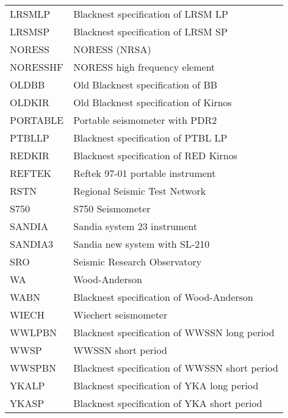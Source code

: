\begin{table}[tp]
\begin{tabular}{ll}
LRSMLP   &  Blacknest specification of LRSM LP  \\
LRSMSP   &  Blacknest specification of LRSM SP  \\
NORESS   &  NORESS (NRSA)   \\
NORESSHF &  NORESS high frequency element   \\
OLDBB    &  Old Blacknest specification of BB   \\
OLDKIR   &  Old Blacknest specification of Kirnos   \\
PORTABLE &  Portable seismometer with PDR2  \\
PTBLLP   &  Blacknest specification of PTBL LP  \\
REDKIR   &  Blacknest specification of RED Kirnos   \\
REFTEK   &  Reftek 97-01 portable instrument    \\
RSTN     &  Regional Seismic Test Network   \\
S750     &  S750 Seismometer    \\
SANDIA   &  Sandia system 23 instrument \\
SANDIA3  &  Sandia new system with SL-210   \\
SRO      &  Seismic Research Observatory    \\
WA       &  Wood-Anderson   \\
WABN     &  Blacknest specification of Wood-Anderson    \\
WIECH    &  Wiechert seismometer    \\
WWLPBN   &  Blacknest specification of WWSSN long period    \\
WWSP     &  WWSSN short period  \\
WWSPBN   &  Blacknest specification of WWSSN short period   \\
YKALP    &  Blacknest specification of YKA long period  \\
YKASP    &  Blacknest specification of YKA short period \\
\bottomrule
\end{tabular}
\end{table}

